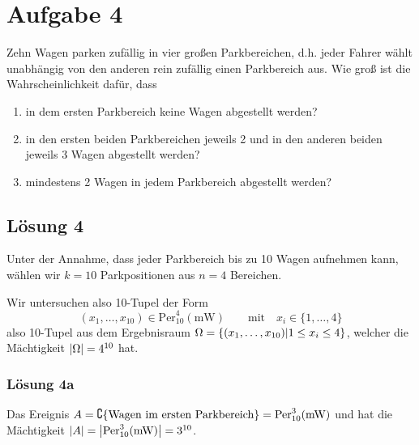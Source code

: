 \documentclass[main.tex]{subfiles}
\begin{document}
\section{Aufgabe 4}
Zehn Wagen parken zufällig in vier großen Parkbereichen, d.h. jeder Fahrer wählt unabhängig von den anderen rein zufällig einen Parkbereich aus. Wie groß ist die Wahrscheinlichkeit dafür, dass
\begin{enumerate}
    \item in dem ersten Parkbereich keine Wagen abgestellt werden?
    \item in den ersten beiden Parkbereichen jeweils 2 und in den anderen beiden jeweils 3 Wagen abgestellt werden?
    \item mindestens 2 Wagen in jedem Parkbereich abgestellt werden?
\end{enumerate}

\subsection{Lösung 4}
Unter der Annahme, dass jeder Parkbereich bis zu 10 Wagen aufnehmen kann, wählen wir $k=10$ Parkpositionen aus $n=4$ Bereichen.

%


Wir untersuchen also 10-Tupel der Form
$$
    (x_1, \ldots, x_{10}) \in \text{Per}^{4}_{10}(\text{mW})
    \qquad \text{mit} \quad
    x_i \in \{ 1, \ldots, 4 \}
$$
also 10-Tupel aus dem Ergebnisraum $\Omega = \set*{(x_1, \ldots, x_{10}) \middle| 1\leq x_i \leq 4}$, welcher die Mächtigkeit $\abs*{\Omega} = 4^{10}$ hat.

\subsubsection{Lösung 4a}
Das Ereignis $A= \complement \set*{ \text{Wagen im ersten Parkbereich}} = \text{Per}^{3}_{10}(\text{mW})$ und hat die Mächtigkeit $\abs*{A} =\abs*{\text{Per}^{3}_{10}(\text{mW})} = 3^{10}$.
\end{document}
